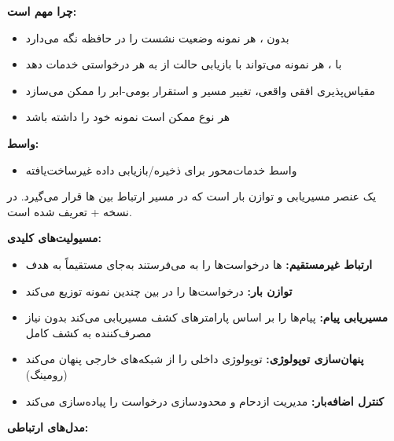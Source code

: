 \textbf{چرا  مهم است:}

\begin{itemize}
\tightlist
\item
  بدون ، هر نمونه  وضعیت نشست را در حافظه نگه می‌دارد
\item
  با ، هر نمونه  می‌تواند با بازیابی حالت از  به هر درخواستی خدمات دهد
\item
  مقیاس‌پذیری افقی واقعی، تغییر مسیر و استقرار بومی-ابر را ممکن می‌سازد
\item
  هر نوع  ممکن است نمونه  خود را داشته باشد
\end{itemize}

\textbf{واسط:}

\begin{itemize}
\tightlist
\item
   واسط خدمات‌محور برای ذخیره/\allowbreak{}بازیابی داده غیرساخت‌یافته
\end{itemize}


 یک عنصر مسیریابی و توازن بار است که در مسیر ارتباط  بین ها قرار می‌گیرد. در  نسخه + تعریف شده است.

\textbf{مسیولیت‌های کلیدی:}

\begin{itemize}
\tightlist
\item
  \textbf{ارتباط غیرمستقیم:} ها درخواست‌ها را به  می‌فرستند به‌جای مستقیماً به  هدف
\item
  \textbf{توازن بار:} درخواست‌ها را در بین چندین نمونه  توزیع می‌کند
\item
  \textbf{مسیریابی پیام:} پیام‌ها را بر اساس پارامترهای کشف مسیریابی می‌کند بدون نیاز  مصرف‌کننده به کشف کامل
\item
  \textbf{پنهان‌سازی توپولوژی:} توپولوژی  داخلی را از شبکه‌های خارجی پنهان می‌کند (رومینگ)
\item
  \textbf{کنترل اضافه‌بار:} مدیریت ازدحام و محدودسازی درخواست را پیاده‌سازی می‌کند
\end{itemize}


\textbf{مدل‌های ارتباطی:}

